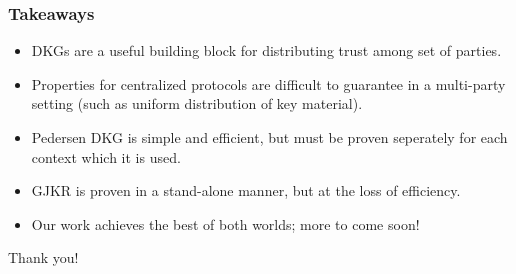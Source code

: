 \documentclass[hyperref={pdfpagelabels=true},table,dvipsnames,14pt,aspectratio=169]{beamer}
\begin{document}
\begin{frame}
  \frametitle{Takeaways}

  \begin{itemize}
    \item DKGs are a useful building block for distributing trust among set of parties.
    \item<2-> Properties for centralized protocols are difficult to guarantee in a multi-party setting (such as uniform distribution of key material).
    \item<3-> Pedersen DKG is simple and efficient, but must be proven seperately for each context which it is used.
    \item<4-> GJKR is proven in a stand-alone manner, but at the loss of efficiency.
    \item<5-> Our work achieves the best of both worlds; more to come soon!
  \end{itemize}
\end{frame}

\begin{frame}

  \huge
  \centering
  Thank you!
\end{frame}
\end{document}
